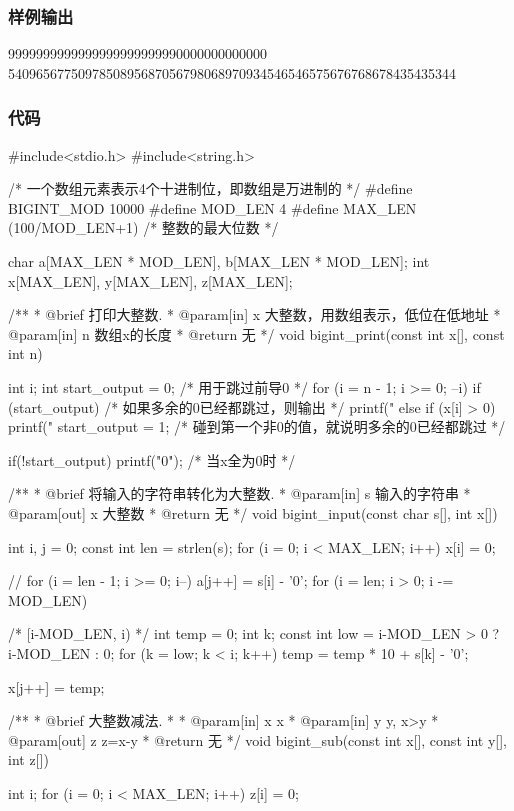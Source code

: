 \subsubsection{样例输出}
\begin{Code}
9999999999999999999999990000000000000
5409656775097850895687056798068970934546546575676768678435435344
\end{Code}

\subsubsection{代码}
\begin{Codex}[label=bigint_sub.c]
#include<stdio.h>
#include<string.h>

/* 一个数组元素表示4个十进制位，即数组是万进制的 */
#define BIGINT_MOD 10000
#define MOD_LEN 4
#define MAX_LEN (100/MOD_LEN+1)  /* 整数的最大位数 */

char    a[MAX_LEN * MOD_LEN], b[MAX_LEN * MOD_LEN];
int     x[MAX_LEN], y[MAX_LEN], z[MAX_LEN];

/**
 * @brief 打印大整数.
 * @param[in] x 大整数，用数组表示，低位在低地址
 * @param[in] n 数组x的长度
 * @return 无
 */
void bigint_print(const int x[], const int n) {
    int i;
    int start_output = 0;  /* 用于跳过前导0 */
    for (i = n - 1; i >= 0; --i) {
        if (start_output) {  /* 如果多余的0已经都跳过，则输出 */
            printf("%
        } else if (x[i] > 0) {
            printf("%
            start_output = 1; /* 碰到第一个非0的值，就说明多余的0已经都跳过 */
        }
    }

    if(!start_output) printf("0");  /* 当x全为0时 */
}

/**
 * @brief 将输入的字符串转化为大整数.
 * @param[in] s 输入的字符串
 * @param[out] x 大整数
 * @return 无
 */
void bigint_input(const char s[], int x[]) {
    int i, j = 0;
    const int len = strlen(s);
    for (i = 0; i < MAX_LEN; i++) x[i] = 0;

    // for (i = len - 1; i >= 0; i--) a[j++] = s[i] - '0';
    for (i = len; i > 0; i -= MOD_LEN) {  /* [i-MOD_LEN, i) */
        int temp = 0;
        int k;
        const int low = i-MOD_LEN > 0 ? i-MOD_LEN : 0;
        for (k = low; k < i; k++) {
            temp = temp * 10 + s[k] - '0';
        }

        x[j++] = temp;
    }
}

/**
 * @brief 大整数减法.
 *
 * @param[in] x x
 * @param[in] y y, x>y
 * @param[out] z z=x-y
 * @return 无
 */
void bigint_sub(const int x[], const int y[], int z[]) {
    int i;
    for (i = 0; i < MAX_LEN; i++) z[i] = 0;

}
\end{Codex}
